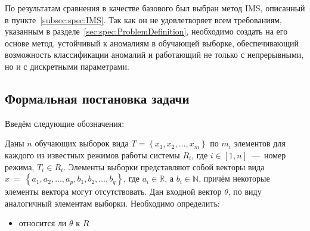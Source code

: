 По результатам сравнения в качестве базового был выбран метод IMS, описанный в пункте~\ref{subsec:spec:IMS}. Так как он не удовлетворяет всем требованиям, указанным в разделе~\ref{sec:spec:ProblemDefinition}, необходимо создать на его основе метод, устойчивый к аномалиям в обучающей выборке, обеспечивающий возможность классификации аномалий и работающий не только с непрерывными, но и с дискретными параметрами.

\subsection{Формальная постановка задачи}
Введём следующие обозначения:
\begin{description}
	\item 
\end{description}
Даны $n$ обучающих выборок вида $T = \left\{x_1,x_2,\dots,x_m\right\}$ по $m_i$ элементов для каждого из известных режимов работы системы $R_i$, где $i\in[1,n]$~---~номер режима, $T_i\in R_i$. Элементы выборки представляют собой векторы вида $x~=~\left\{a_1,a_2,\dots,a_p,b_1,b_2,\dots,b_q\right\}$, где $a_i\in\mathbb{R}$, а $b_i\in\mathbb{N}$, причём некоторые элементы вектора могут отсутствовать. Дан входной вектор $\theta$, по виду аналогичный элементам выборки. Необходимо определить:
\begin{itemize}
	\item относится ли $\theta$ к $R$
\end{itemize}